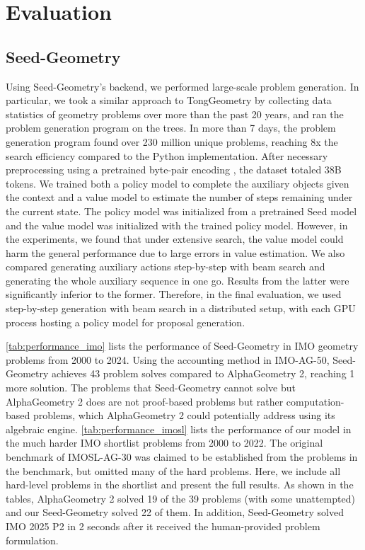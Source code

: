 \section{Evaluation}

\subsection{Seed-Geometry}
Using Seed-Geometry's backend, we performed large-scale problem generation. In particular, we took a similar approach to TongGeometry \cite{zhang2024proposing} by collecting data statistics of geometry problems over more than the past 20 years, and ran the problem generation program on the trees. In more than 7 days, the problem generation program found over 230 million unique problems, reaching 8x the search efficiency compared to the Python implementation. After necessary preprocessing using a pretrained byte-pair encoding \cite{sennrich2015neural}, the dataset totaled 38B tokens. We trained both a policy model to complete the auxiliary objects given the context and a value model to estimate the number of steps remaining under the current state. The policy model was initialized from a pretrained Seed model and the value model was initialized with the trained policy model. However, in the experiments, we found that under extensive search, the value model could harm the general performance due to large errors in value estimation. We also compared generating auxiliary actions step-by-step with beam search and generating the whole auxiliary sequence in one go. Results from the latter were significantly inferior to the former. Therefore, in the final evaluation, we used step-by-step generation with beam search in a distributed setup, with each GPU process hosting a policy model for proposal generation.

\cref{tab:performance_imo} lists the performance of Seed-Geometry in IMO geometry problems from 2000 to 2024. Using the accounting method in IMO-AG-50, Seed-Geometry achieves 43 problem solves compared to AlphaGeometry 2, reaching 1 more solution. The problems that Seed-Geometry cannot solve but AlphaGeometry 2 does are not proof-based problems but rather computation-based problems, which AlphaGeometry 2 could potentially address using its algebraic engine.
\cref{tab:performance_imosl} lists the performance of our model in the much harder IMO shortlist problems from 2000 to 2022. The original benchmark of IMOSL-AG-30 was claimed to be established from the problems in the benchmark, but omitted many of the hard problems. Here, we include all hard-level problems in the shortlist and present the full results. As shown in the tables, AlphaGeometry 2 solved 19 of the 39 problems (with some unattempted) and our Seed-Geometry solved 22 of them.
In addition, Seed-Geometry solved IMO 2025 P2 in 2 seconds after it received the human-provided problem formulation.

